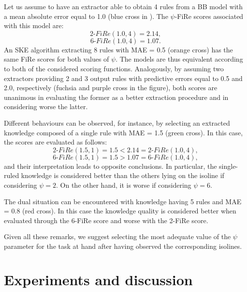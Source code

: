 \documentclass{article}
\newcommand{\fire}{FiRe}
\newcommand{\psifire}{$\psi$-\fire}
\begin{document}
Let us assume to have an extractor able to obtain 4 rules from a BB model with a mean absolute error equal to 1.0 (blue cross in ).
%
The \psifire{} scores associated with this model are:
%
\begin{equation*}
	2\textrm{-}\fire(1.0, 4)=2.14,
\end{equation*}
%
\begin{equation*}
	6\textrm{-}\fire(1.0, 4)=1.07.
\end{equation*}
%
An SKE algorithm extracting 8 rules with MAE = 0.5 (orange cross) has the same \fire{} scores for both values of $\psi$.
%
The models are thus equivalent according to both of the considered scoring functions.
%
Analogously, by assuming two extractors providing 2 and 3 output rules with predictive errors equal to 0.5 and 2.0, respectively (fuchsia and purple cross in the figure), both scores are unanimous in evaluating the former as a better extraction procedure and in considering worse the latter.

Different behaviours can be observed, for instance, by selecting an extracted knowledge composed of a single rule with MAE = 1.5 (green cross).
%
In this case, the scores are evaluated as follows:
%
\begin{equation*}
	2\textrm{-}\fire(1.5, 1)=1.5 < 2.14 = 2\textrm{-}\fire(1.0, 4),
\end{equation*}
%
\begin{equation*}
	6\textrm{-}\fire(1.5, 1)=1.5 > 1.07 = 6\textrm{-}\fire(1.0, 4),
\end{equation*}
%
and their interpretation leads to opposite conclusions.
%
In particular, the single-ruled knowledge is considered better than the others lying on the isoline if considering $\psi=2$.
%
On the other hand, it is worse if considering $\psi=6$.

The dual situation can be encountered with knowledge having 5 rules and MAE = 0.8 (red cross).
%
In this case the knowledge quality is considered better when evaluated through the 6-\fire{} score and worse with the 2-\fire{} score.

Given all these remarks, we suggest selecting the most adequate value of the $\psi$ parameter for the task at hand after having observed the corresponding isolines.

\section{Experiments and discussion}\label{sec:experiments}
\end{document}
